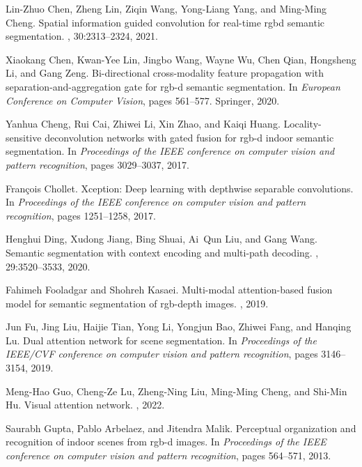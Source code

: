 \documentclass[10pt,twocolumn,letterpaper]{article}
\begin{document}
\begin{thebibliography}{10}
Lin-Zhuo Chen, Zheng Lin, Ziqin Wang, Yong-Liang Yang, and Ming-Ming Cheng.
\newblock Spatial information guided convolution for real-time rgbd semantic
  segmentation.
, 30:2313--2324, 2021.

Xiaokang Chen, Kwan-Yee Lin, Jingbo Wang, Wayne Wu, Chen Qian, Hongsheng Li,
  and Gang Zeng.
\newblock Bi-directional cross-modality feature propagation with
  separation-and-aggregation gate for rgb-d semantic segmentation.
\newblock In {\em European Conference on Computer Vision}, pages 561--577.
  Springer, 2020.

Yanhua Cheng, Rui Cai, Zhiwei Li, Xin Zhao, and Kaiqi Huang.
\newblock Locality-sensitive deconvolution networks with gated fusion for rgb-d
  indoor semantic segmentation.
\newblock In {\em Proceedings of the IEEE conference on computer vision and
  pattern recognition}, pages 3029--3037, 2017.

Fran{\c{c}}ois Chollet.
\newblock Xception: Deep learning with depthwise separable convolutions.
\newblock In {\em Proceedings of the IEEE conference on computer vision and
  pattern recognition}, pages 1251--1258, 2017.

Henghui Ding, Xudong Jiang, Bing Shuai, Ai~Qun Liu, and Gang Wang.
\newblock Semantic segmentation with context encoding and multi-path decoding.
, 29:3520--3533, 2020.

Fahimeh Fooladgar and Shohreh Kasaei.
\newblock Multi-modal attention-based fusion model for semantic segmentation of
  rgb-depth images.
, 2019.

Jun Fu, Jing Liu, Haijie Tian, Yong Li, Yongjun Bao, Zhiwei Fang, and Hanqing
  Lu.
\newblock Dual attention network for scene segmentation.
\newblock In {\em Proceedings of the IEEE/CVF conference on computer vision and
  pattern recognition}, pages 3146--3154, 2019.

Meng-Hao Guo, Cheng-Ze Lu, Zheng-Ning Liu, Ming-Ming Cheng, and Shi-Min Hu.
\newblock Visual attention network.
, 2022.

Saurabh Gupta, Pablo Arbelaez, and Jitendra Malik.
\newblock Perceptual organization and recognition of indoor scenes from rgb-d
  images.
\newblock In {\em Proceedings of the IEEE conference on computer vision and
  pattern recognition}, pages 564--571, 2013.


\end{thebibliography}
\end{document}
